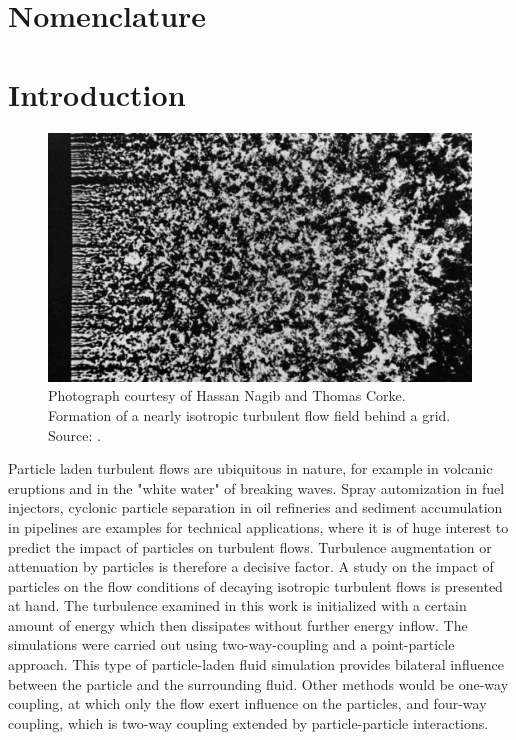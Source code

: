 \documentclass[11pt,a4paper,openany,oneside,parskip=half*]{article}
\begin{document}
\section{Nomenclature}
\printnomenclature
\pagebreak
\renewcommand{\thesection}{\arabic{section}}
\setcounter{section}{0}
\section{Introduction}
\setcounter{page}{1}
\begin{figure}[h]
	\centering
  \includegraphics[width=\textwidth]{./Abbildungen/TurbulentMotion_Introduction.png}
  \captionsetup{width=0.97\linewidth}
	\caption{Photograph courtesy of Hassan Nagib and Thomas Corke. Formation of a nearly isotropic turbulent flow field behind a grid. Source: \cite{albumOfTurbulentMotion}.}
	\label{introduction_picture}
\end{figure}
Particle laden turbulent flows are ubiquitous in nature, for example  in volcanic eruptions and in the "white water" of breaking waves.
Spray automization in fuel injectors, cyclonic particle separation in oil refineries and sediment accumulation in pipelines are examples for technical applications, where it is of huge interest to predict the impact of particles on turbulent flows.
Turbulence augmentation or attenuation by particles is therefore a decisive factor.
\newline
A study on the impact of particles on the flow conditions of decaying isotropic turbulent flows is presented at hand. The turbulence examined in this work is initialized with a certain amount of energy which then dissipates without further energy inflow. The simulations were carried out using two-way-coupling and a point-particle approach. This type of particle-laden fluid simulation provides bilateral influence between the particle and the surrounding fluid. Other methods would be one-way coupling, at which only the flow exert influence on the particles, and four-way coupling, which is two-way coupling extended by particle-particle interactions. 
\end{document}
